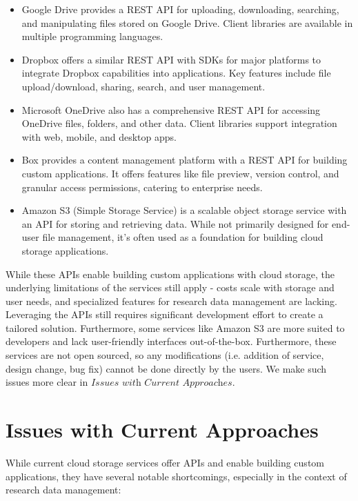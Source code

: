 \documentclass[conference]{IEEEtran}
\begin{document}
\begin{itemize}
\item Google Drive provides a REST API \cite{googledrive} for uploading, downloading, searching, and manipulating files stored on Google Drive. Client libraries are available in multiple programming languages.

\item Dropbox offers a similar REST API \cite{dropbox} with SDKs for major platforms to integrate Dropbox capabilities into applications. Key features include file upload/download, sharing, search, and user management.

\item Microsoft OneDrive also has a comprehensive REST API \cite{onedrive} for accessing OneDrive files, folders, and other data. Client libraries support integration with web, mobile, and desktop apps.

\item Box provides a content management platform with a REST API \cite{box} for building custom applications. It offers features like file preview, version control, and granular access permissions, catering to enterprise needs.

\item Amazon S3 (Simple Storage Service) is a scalable object storage service with an API \cite{amazonweb} for storing and retrieving data. While not primarily designed for end-user file management, it's often used as a foundation for building cloud storage applications.
\end{itemize}

While these APIs enable building custom applications with cloud storage, the underlying limitations of the services still apply - costs scale with storage and user needs, and specialized features for research data management are lacking. Leveraging the APIs still requires significant development effort to create a tailored solution. Furthermore, some services like Amazon S3 are more suited to developers and lack user-friendly interfaces out-of-the-box.
Furthermore, these services are not open sourced, so any modifications (i.e. addition of service, design change, bug fix) cannot be done directly by the users.
We make such issues more clear in $\textit{Issues with Current Approaches}$.

\section{Issues with Current Approaches}
While current cloud storage services offer APIs and enable building custom applications, they have several notable shortcomings, especially in the context of research data management:
\end{document}
